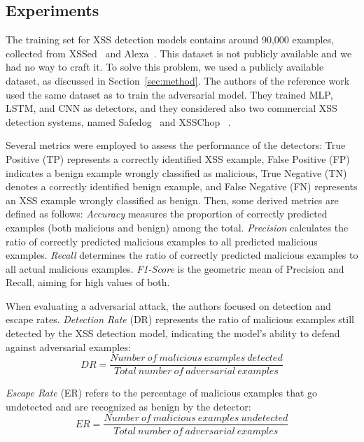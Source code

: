 \subsection{Experiments}

The training set for XSS detection models contains around 90,000 examples, collected from XSSed~\cite{kf} and Alexa~\cite{Cooper}.
This dataset is not publicly available and we had no way to craft it. To solve this problem, we used a publicly available dataset, as discussed in Section~\ref{sec:method}.
The authors of the reference work used the same dataset as \cite{wang2022black} to train the adversarial model.
They trained MLP, LSTM, and CNN as detectors, and they considered also two commercial XSS detection systems, named Safedog~\cite{Safedog} and XSSChop ~\cite{Chaitin}.

Several metrics were employed to assess the performance of the detectors: True Positive (TP) represents a correctly identified XSS example, False Positive (FP) indicates a benign example wrongly classified as malicious, True Negative (TN) denotes a correctly identified benign example, and False Negative (FN) represents an XSS example wrongly classified as benign. Then, some derived metrics are defined as follows: \textit{Accuracy} measures the proportion of correctly predicted examples (both malicious and benign) among the total. \textit{Precision} calculates the ratio of correctly predicted malicious examples to all predicted malicious examples. \textit{Recall} determines the ratio of correctly predicted malicious examples to all actual malicious examples. \textit{F1-Score} is the geometric mean of Precision and Recall, aiming for high values of both.






When evaluating a adversarial attack, the authors focused on detection and escape rates. \textit{Detection Rate} (DR) represents the ratio of malicious examples still detected by the XSS detection model, indicating the model's ability to defend against adversarial examples:
\begin{equation}
\label{eqn:6}
 DR = \frac{Number\ of\ malicious\ examples\ detected }{Total\ number\ of\ adversarial\ examples }
\end{equation}

\noindent
\textit{Escape Rate} (ER) refers to the percentage of malicious examples that go undetected and are recognized as benign by the detector:
\begin{equation}
\label{eqn:7}
 ER =\frac{Number\ of\ malicious\ examples\ undetected }{Total\ number\ of\ adversarial\ examples }
\end{equation}




